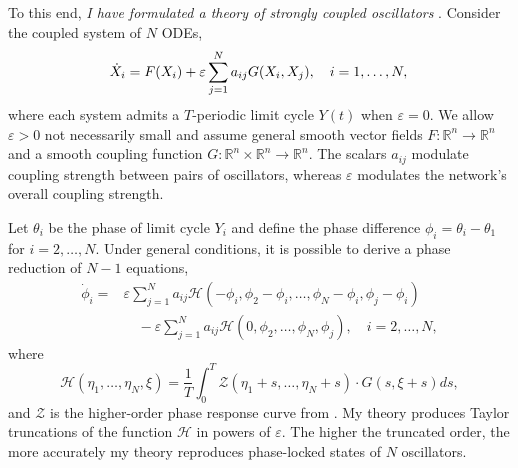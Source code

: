 \documentclass[a4paper,11pt]{article}
\newcommand{\ve}{\varepsilon}
\newcommand{\h}{\mathcal{H}}
\begin{document}
	To this end, \textit{I have formulated a theory of strongly coupled oscillators} \cite{park2021high}. Consider the coupled system of $N$ ODEs,
	\begin{equation}\label{eq:odes}
		\dot X_i = F(X_i) +\ve \sum_{j=1}^N a_{ij} G(X_i,X_j), \quad i=1,\ldots,N,\\
	\end{equation}
	where each system admits a $T$-periodic limit cycle $Y(t)$ when $\ve=0$. We allow $\ve>0$ not necessarily small and assume general smooth vector fields $F:\mathbb{R}^n \rightarrow \mathbb{R}^n$ and a smooth coupling function $G:\mathbb{R}^n\times\mathbb{R}^n\rightarrow \mathbb{R}^n$. The scalars $a_{ij}$ modulate coupling strength between pairs of oscillators, whereas $\ve$ modulates the network's overall coupling strength.
	
	Let $\theta_i$ be the phase of limit cycle $Y_i$ and define the phase difference $\phi_i=\theta_i-\theta_1$ for $i=2,\ldots,N$. Under general conditions, it is possible to derive a phase reduction of $N-1$ equations,
	\begin{align*}
		\dot \phi_i =& \ve\sum_{j=1}^N a_{ij} \h(-\phi_i,\phi_2-\phi_i,\ldots,\phi_N-\phi_i,\phi_j-\phi_i)\\
		&\quad- \ve\sum_{j=1}^N a_{ij} \h(0,\phi_2,\ldots,\phi_N,\phi_j), \quad i=2,\ldots,N,
	\end{align*}
	where
	\begin{equation*}
		\h(\eta_1,\ldots,\eta_N,\xi) = \frac{1}{T} \int_0^T \mathcal{Z}(\eta_1+s,\ldots,\eta_N+s) \cdot G(s,\xi+s)ds,
	\end{equation*}
	and $\mathcal{Z}$ is the higher-order phase response curve from \cite{wilson2020phase}. My theory produces Taylor truncations of the function $\h$ in powers of $\ve$. The higher the truncated order, the more accurately my theory reproduces phase-locked states of $N$ oscillators.
	
\end{document}
